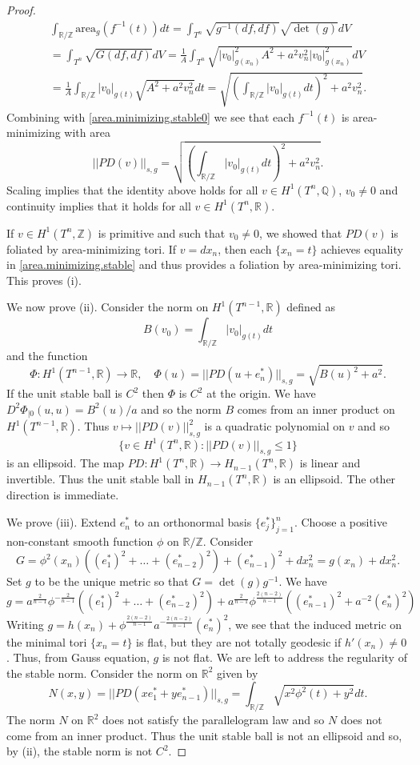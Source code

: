 \documentclass[11pt]{amsart}
\def\R{\mathbb R}
\def\Q{\mathbb Q}
\def\Z{\mathbb Z}
\theoremstyle{remark}
\theoremstyle{definition}
\begin{document}
\begin{proof}
\begin{multline*}
			\int_{\R/\Z}\text{area}_g(f^{-1}(t))dt=\int_{T^n}\sqrt{g^{-1}(df,df)}\sqrt{\det(g)}dV\\
			=\int_{T^n}\sqrt{G(df,df)}dV=\frac{1}{A}\int_{T^n}\sqrt{|v_0|_{g(x_n)}^2A^2+a^2v_n^2|v_0|_{g(x_n)}^2}dV\\
			=\frac{1}{A}\int_{\R/\Z}|v_0|_{g(t)}\sqrt{A^2+a^2v_n^2}dt=\sqrt{\left(\int_{\R/\Z}|v_0|_{g(t)}dt\right)^{2}+a^2v_n^2}.
		\end{multline*}
		Combining with \eqref{area.minimizing.stable0} we see that each $f^{-1}(t)$ is area-minimizing with area
		$$||PD(v)||_{s,g}=\sqrt{\left(\int_{\R/\Z}|v_0|_{g(t)}dt\right)^{2}+a^2v_n^2}.$$
		Scaling implies that the identity above  holds for all $v\in H^1(T^n,\Q)$, $v_0\neq 0$ and continuity implies that it holds for all $v\in H^1(T^n,\R)$.
		
		If $v\in H^1(T^n,\Z)$ is primitive and such that $v_0\neq 0$, we showed that $PD(v)$ is foliated by area-minimizing tori. If $v=dx_n$, then each $\{x_n=t\}$ achieves equality in \eqref{area.minimizing.stable} and thus provides a foliation by area-minimizing tori. This proves (i). 
		
		We now prove (ii). Consider the norm on $H^1(T^{n-1},\R)$ defined as
		\begin{equation*}\label{norm.B}
			B(v_0)=\int_{\R/\Z}|v_0|_{g(t)}dt
		\end{equation*}
		and the function
		$$\Phi:H^1(T^{n-1},\R)\rightarrow \R, \quad \Phi(u)=||PD(u+ e_n^*)||_{s,g}=\sqrt{B(u)^2+a^2}.$$
		If the unit stable ball is $C^2$ then $\Phi$ is $C^2$ at the origin. We have 
		$D^2\Phi_{|0}(u,u)=B^2(u)/a$ and so the norm $B$ comes from an inner product on $H^1(T^{n-1},\R)$. Thus $v\mapsto ||PD(v)||^2_{s,g}$ is a quadratic polynomial on $v$ and so 
		$$\{v\in H^1(T^n,\R):||PD(v)||_{s,g}\leq 1\}$$
		is an ellipsoid.  The map $PD:H^1(T^n,\R)\rightarrow H_{n-1}(T^n,\R)$ is linear and invertible. Thus the unit stable ball in $H_{n-1}(T^n,\R)$ is an ellipsoid. The other direction is immediate.
		
		We prove (iii). Extend $e_n^*$ to an orthonormal basis $\{e_j^*\}_{j=1}^n$. Choose a positive non-constant smooth function $\phi$ on $\R/\Z$. Consider
		$$G=\phi^2(x_n)((e_1^*)^2+\ldots+(e_{n-2}^*)^2)+(e_{n-1}^*)^2+dx_n^2=g(x_n)+dx_n^2.$$
		Set $g$ to be the unique metric so that $G=\det(g)g^{-1}$. We have 
		$$
		g=a^{\frac{2}{n-1}}\phi^{-\frac{2}{n-1}}((e_1^*)^2+\ldots+(e_{n-2}^*)^2)+a^{\frac{2}{n-1}}\phi^{\frac{2(n-2)}{n-1}}((e_{n-1}^*)^2+a^{-2}(e_n^*)^2)
		$$
		Writing $g=h(x_n)+\phi^{\frac{2(n-2)}{n-1}}a^{-\frac{2(n-2)}{n-1}}(e_n^*)^2$, we see that the induced metric on the minimal tori $\{x_{n}=t\}$ is flat, but they are not totally geodesic if $h'(x_n)\neq 0$. Thus, from Gauss equation, $g$ is not flat.
		We are left to address the regularity of the stable norm. Consider the norm on $\R^2$  given by
		$$N(x,y)=||PD(xe_1^*+y e_{n-1}^*)||_{s,g}=\int_{\R/\Z}\sqrt{x^2\phi^2(t)+y^2}dt.$$
		The norm $N$ on $\R^2$ does not satisfy the parallelogram law and so $N$ does not come from an inner product. Thus the unit stable ball is not an ellipsoid and so, by (ii),  the stable norm is not $C^2$.
		
	\end{proof}
	
\end{document}
